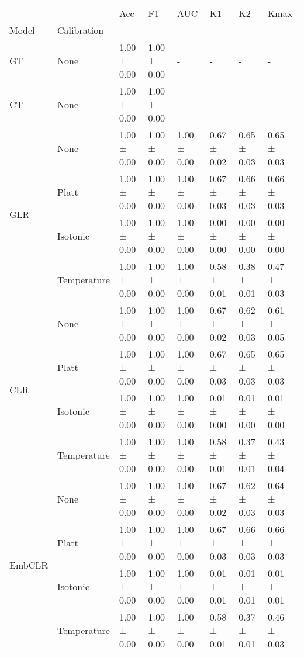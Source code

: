 \begin{tabular}{llllllll}
\toprule
 &  & Acc & F1 & AUC & K1 & K2 & Kmax \\
Model & Calibration &  &  &  &  &  &  \\
\midrule
GT & None & 1.00 ± 0.00 & 1.00 ± 0.00 & - & - & - & - \\
\cline{1-8}
CT & None & 1.00 ± 0.00 & 1.00 ± 0.00 & - & - & - & - \\
\cline{1-8}
\multirow[t]{4}{*}{GLR} & None & 1.00 ± 0.00 & 1.00 ± 0.00 & 1.00 ± 0.00 & 0.67 ± 0.02 & 0.65 ± 0.03 & 0.65 ± 0.03 \\
 & Platt & 1.00 ± 0.00 & 1.00 ± 0.00 & 1.00 ± 0.00 & 0.67 ± 0.03 & 0.66 ± 0.03 & 0.66 ± 0.03 \\
 & Isotonic & 1.00 ± 0.00 & 1.00 ± 0.00 & 1.00 ± 0.00 & 0.00 ± 0.00 & 0.00 ± 0.00 & 0.00 ± 0.00 \\
 & Temperature & 1.00 ± 0.00 & 1.00 ± 0.00 & 1.00 ± 0.00 & 0.58 ± 0.01 & 0.38 ± 0.01 & 0.47 ± 0.03 \\
\cline{1-8}
\multirow[t]{4}{*}{CLR} & None & 1.00 ± 0.00 & 1.00 ± 0.00 & 1.00 ± 0.00 & 0.67 ± 0.02 & 0.62 ± 0.03 & 0.61 ± 0.05 \\
 & Platt & 1.00 ± 0.00 & 1.00 ± 0.00 & 1.00 ± 0.00 & 0.67 ± 0.03 & 0.65 ± 0.03 & 0.65 ± 0.03 \\
 & Isotonic & 1.00 ± 0.00 & 1.00 ± 0.00 & 1.00 ± 0.00 & 0.01 ± 0.00 & 0.01 ± 0.00 & 0.01 ± 0.00 \\
 & Temperature & 1.00 ± 0.00 & 1.00 ± 0.00 & 1.00 ± 0.00 & 0.58 ± 0.01 & 0.37 ± 0.01 & 0.43 ± 0.04 \\
\cline{1-8}
\multirow[t]{4}{*}{EmbCLR} & None & 1.00 ± 0.00 & 1.00 ± 0.00 & 1.00 ± 0.00 & 0.67 ± 0.02 & 0.62 ± 0.03 & 0.64 ± 0.03 \\
 & Platt & 1.00 ± 0.00 & 1.00 ± 0.00 & 1.00 ± 0.00 & 0.67 ± 0.03 & 0.66 ± 0.03 & 0.66 ± 0.03 \\
 & Isotonic & 1.00 ± 0.00 & 1.00 ± 0.00 & 1.00 ± 0.00 & 0.01 ± 0.01 & 0.01 ± 0.01 & 0.01 ± 0.01 \\
 & Temperature & 1.00 ± 0.00 & 1.00 ± 0.00 & 1.00 ± 0.00 & 0.58 ± 0.01 & 0.37 ± 0.01 & 0.46 ± 0.03 \\
\cline{1-8}
\bottomrule
\end{tabular}
